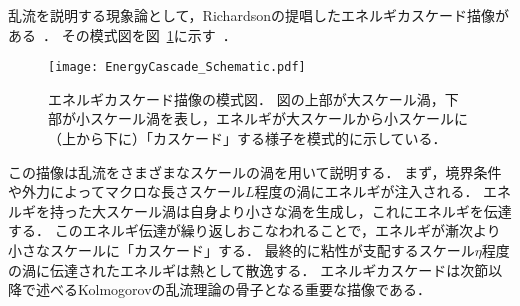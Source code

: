乱流を説明する現象論として，Richardsonの提唱したエネルギカスケード描像がある~\cite{Goto2017a,GotoJPS2018}．
その模式図を図~\ref{fig:EnergyCascade_Schematic.pdf}に示す~\cite{gotolab}．
\begin{figure}[!t]
  \centering
  \texttt{[image: EnergyCascade\_Schematic.pdf]}
  \caption{
    エネルギカスケード描像の模式図．
    図の上部が大スケール渦，下部が小スケール渦を表し，エネルギが大スケールから小スケールに（上から下に）「カスケード」する様子を模式的に示している．
  }
  \label{fig:EnergyCascade_Schematic.pdf}
\end{figure}
この描像は乱流をさまざまなスケールの渦を用いて説明する．
まず，境界条件や外力によってマクロな長さスケール\(L\)程度の渦にエネルギが注入される．
エネルギを持った大スケール渦は自身より小さな渦を生成し，これにエネルギを伝達する．
このエネルギ伝達が繰り返しおこなわれることで，エネルギが漸次より小さなスケールに「カスケード」する．
最終的に粘性が支配するスケール\(\eta\)程度の渦に伝達されたエネルギは熱として散逸する．
エネルギカスケードは次節以降で述べるKolmogorovの乱流理論の骨子となる重要な描像である．
